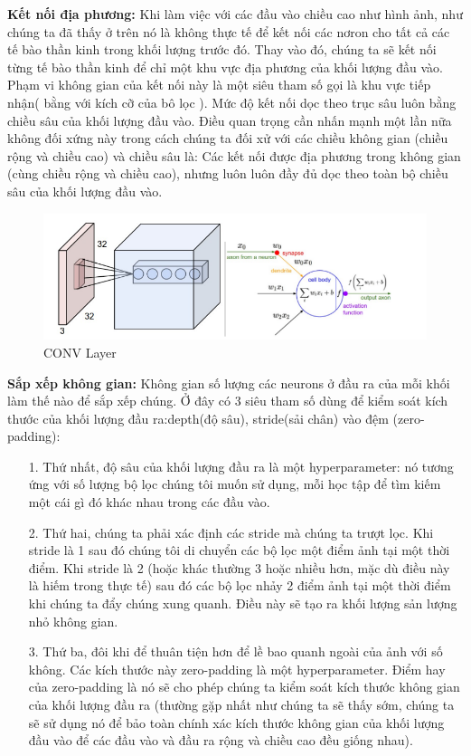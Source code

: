 \documentclass[a4paper,12pt]{report}
\begin{document}
\textbf{Kết nối địa phương:} Khi làm việc với các đầu vào chiều cao như hình ảnh, như chúng ta đã thấy ở trên nó là không thực tế để kết nối các nơron cho tất cả các tế bào thần kinh trong khối lượng trước đó.  Thay vào đó, chúng ta sẽ kết nối từng tế bào thần kinh để chỉ một khu vực địa phương của khối lượng đầu vào. Phạm vi không gian của kết nối này là một siêu tham số gọi là khu vực tiếp nhận( bằng với kích cỡ của bô lọc ). Mức độ kết nối dọc theo trục sâu luôn bằng chiều sâu của khối lượng đầu vào. Điều quan trọng cần nhấn mạnh một lần nữa không đối xứng này trong cách chúng ta đối xử với các chiều không gian (chiều rộng và chiều cao) và chiều sâu là: Các kết nối được địa phương trong không gian (cùng chiều rộng và chiều cao), nhưng luôn luôn đầy đủ dọc theo toàn bộ chiều sâu của khối lượng đầu vào.
\begin{figure}[H]
\includegraphics[scale=0.7]{img2.png}
\caption{CONV Layer}
\end{figure}
\textbf{Sắp xếp không gian:} Không gian số lượng các neurons ở đầu ra của mỗi khối làm thế nào để sắp xếp chúng. Ở đây có 3 siêu tham số dùng để kiểm soát kích thước của khối lượng đầu ra:depth(độ sâu), stride(sải chân) vào đệm (zero-padding):
\begin{itemize}
\item[1. ] Thứ nhất, độ sâu của khối lượng đầu ra là một hyperparameter: nó tương ứng với số lượng bộ lọc chúng tôi muốn sử dụng, mỗi học tập để tìm kiếm một cái gì đó khác nhau trong các đầu vào.
\item[2. ] Thứ hai, chúng ta phải xác định các stride mà chúng ta trượt lọc. Khi stride là 1 sau đó chúng tôi di chuyển các bộ lọc một điểm ảnh tại một thời điểm. Khi stride là 2 (hoặc khác thường 3 hoặc nhiều hơn, mặc dù điều này là hiếm trong thực tế) sau đó các bộ lọc nhảy 2 điểm ảnh tại một thời điểm khi chúng ta đẩy chúng xung quanh. Điều này sẽ tạo ra khối lượng sản lượng nhỏ không gian.
\item[3. ] Thứ ba, đôi khi để thuân tiện hơn để lề bao quanh ngoài của ảnh với số không. Các kích thước này zero-padding là một hyperparameter. Điểm hay của zero-padding là nó sẽ cho phép chúng ta kiểm soát kích thước không gian của khối lượng đầu ra (thường gặp nhất như chúng ta sẽ thấy sớm, chúng ta sẽ sử dụng nó để bảo toàn chính xác kích thước không gian của khối lượng đầu vào để các đầu vào và đầu ra rộng và chiều cao đều giống nhau).
\end{itemize} 
\end{document}
